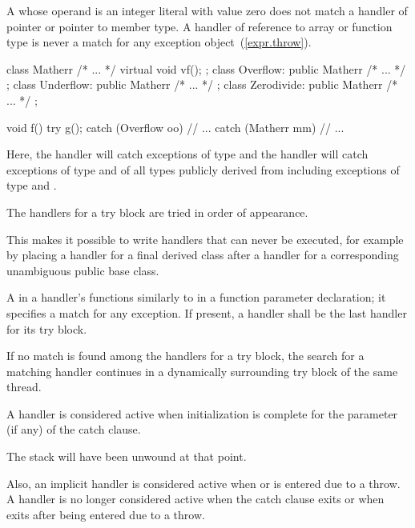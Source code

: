 \begin{note}
A
whose operand is an integer literal with value zero does not match a handler of
pointer or pointer to member type.
A handler of reference to array or function type
is never a match for any exception object~(\ref{expr.throw}).
\end{note}

\begin{example}
\begin{codeblock}
class Matherr { /* ... */ virtual void vf(); };
class Overflow: public Matherr { /* ... */ };
class Underflow: public Matherr { /* ... */ };
class Zerodivide: public Matherr { /* ... */ };

void f() {
  try {
    g();
  } catch (Overflow oo) {
        // ...
  } catch (Matherr mm) {
        // ...
  }
}
\end{codeblock}
Here, the
handler will catch exceptions of type
and the
handler will catch exceptions of type
and of all types publicly derived from
including exceptions of type
and
.
\end{example}

\pnum
The handlers for a try block are tried in order of appearance.
\begin{note}
This makes it possible to write handlers that can never be
executed, for example by placing a handler for a final derived class after
a handler for a corresponding unambiguous public base class.
\end{note}

\pnum
A
in a handler's
functions similarly to
in a function parameter declaration;
it specifies a match for any exception.
If present, a
handler shall be the last handler for its try block.

\pnum
If no match is found among the handlers for a try block,
the search for a matching
handler continues in a dynamically surrounding try block
of the same thread.

\pnum
A handler is considered active when initialization is complete for
the parameter (if any) of the catch clause.
\begin{note}
The stack will have been unwound at that point.
\end{note}
Also, an implicit handler is considered active when
or
is entered due to a throw. A handler is no longer considered active when the
catch clause exits or when
exits after being entered due to a throw.

